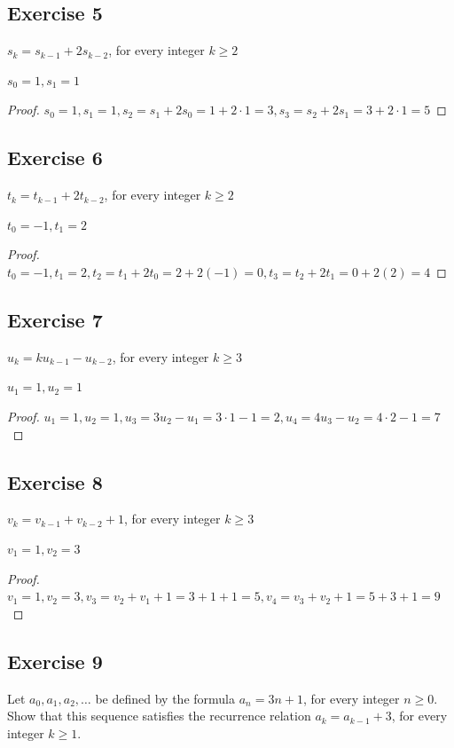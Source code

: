 \documentclass[14pt]{extarticle}
\begin{document}
\subsection{Exercise 5}
$s_k = s_{k - 1} + 2s_{k - 2}$, for every integer $k \geq 2$ 

$s_0 = 1, s_1 = 1$

\begin{proof}
$s_0 = 1, s_1 = 1, s_2 = s_1 + 2s_0 = 1 + 2\cdot 1 = 3, s_3 = s_2 + 2s_1 = 3 + 2\cdot 1 = 5$
\end{proof}

\subsection{Exercise 6}
$t_k = t_{k - 1} + 2t_{k - 2}$, for every integer $k \geq 2$

$t_0 = -1, t_1 = 2$

\begin{proof}
$t_0 = -1, t_1 = 2, t_2 = t_1 + 2t_0 = 2 + 2(-1) = 0, t_3 = t_2 + 2t_1 = 0 + 2(2) = 4$
\end{proof}

\subsection{Exercise 7}
$u_k = ku_{k - 1} - u_{k - 2}$, for every integer $k \geq 3$

$u_1 = 1, u_2 = 1$

\begin{proof}
$u_1 = 1, u_2 = 1, u_3 = 3u_2 - u_1 = 3 \cdot 1 - 1 = 2, u_4 = 4u_3 - u_2 = 4 \cdot 2 - 1 = 7$
\end{proof}

\subsection{Exercise 8}
$v_k = v_{k-1} + v_{k-2} + 1$, for every integer $k \geq 3$

$v_1 = 1, v_2 = 3$

\begin{proof}
$v_1 = 1, v_2 = 3, v_3 = v_2 + v_1 + 1 = 3 + 1 + 1 = 5, v_4 = v_3 + v_2 + 1 = 5 + 3 + 1 = 9$
\end{proof}

\subsection{Exercise 9}
Let $a_0, a_1, a_2, \ldots$ be defined by the formula $a_n = 3n + 1$, for every integer $n \geq 0$. Show that this 
sequence satisfies the recurrence relation $a_k = a_{k - 1} + 3$, for every integer $k \geq 1$.
\end{document}

